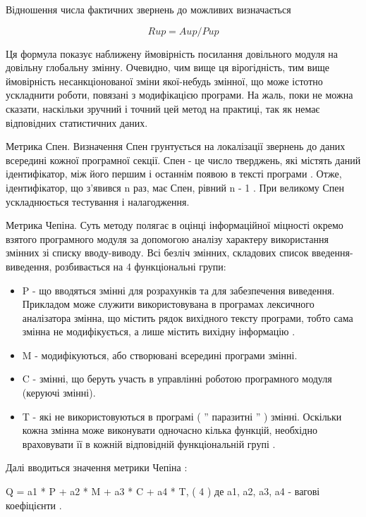 Відношення числа фактичних звернень до можливих визначається

\begin{equation}
 Rup = Aup / Pup
\end{equation}

Ця формула показує наближену ймовірність посилання довільного модуля на довільну глобальну змінну. Очевидно, чим вище ця вірогідність, тим вище ймовірність несанкціонованої зміни якої-небудь змінної, що може істотно ускладнити роботи, пов\dq язані з модифікацією програми. На жаль, поки не можна сказати, наскільки зручний і точний цей метод на практиці, так як немає відповідних статистичних даних.

Метрика Спен.
Визначення Спен грунтується на локалізації звернень до даних всередині кожної програмної секції. Спен - це число тверджень, які містять даний ідентифікатор, між його першим і останнім появою в тексті програми . Отже, ідентифікатор, що з'явився n раз, має Спен, рівний n - 1 . При великому Спен ускладнюється тестування і налагодження.

Метрика Чепіна.
Суть методу полягає в оцінці інформаційної міцності окремо взятого програмного модуля за допомогою аналізу характеру використання змінних зі списку вводу-виводу.
Всі безліч змінних, складових список введення-виведення, розбивається на 4 функціональні групи:

\begin{itemize}
\item P - що вводяться змінні для розрахунків та для забезпечення виведення.
Прикладом може служити використовувана в програмах лексичного аналізатора змінна, що містить рядок вихідного тексту програми, тобто сама змінна не модифікується, а лише містить вихідну інформацію .

\item M - модифікуються, або створювані всередині програми змінні.

\item C - змінні, що беруть участь в управлінні роботою програмного модуля (керуючі змінні).

\item T - які не використовуються в програмі ( '' паразитні '' ) змінні. Оскільки кожна змінна може виконувати одночасно кілька функцій, необхідно враховувати її в кожній відповідній функціональній групі . 
\end{itemize}

Далі вводиться значення метрики Чепіна :

Q = a1 * P + a2 * M + a3 * C + a4 * T, ( 4 )
де a1, a2, a3, a4 - вагові коефіцієнти .

